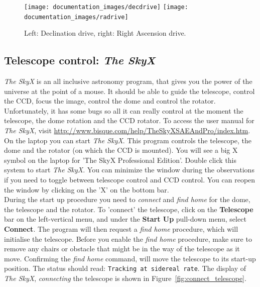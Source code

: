 \documentclass[12pt,twoside,a4paper]{report}
\begin{document}
\begin{figure}[ht]
 \centering
    \texttt{[image: documentation\_images/decdrive]}
    \texttt{[image: documentation\_images/radrive]}
    \caption{\label{fig:drives} Left: Declination drive, right: Right Ascension drive.}
\end{figure}

\subsection{Telescope control: \emph{The SkyX}}

\emph{The SkyX} is an all inclusive astronomy program, that gives you the power of the 
universe at the point of a mouse. It should be able to guide the telescope, control the CCD, 
focus the image, control the dome and control the rotator. 
Unfortunately, it has some bugs so all it can really control at the moment the telescope, the 
dome rotation and the CCD rotator. To access the user manual for \emph{The SkyX}, 
visit \url{http://www.bisque.com/help/TheSkyXSAEAndPro/index.htm}.\\

On the laptop you can start \emph{The SkyX}. This program controls the telescope, the dome and the
rotator (on which the CCD is mounted).
You will see a big X symbol on the laptop for 'The SkyX Professional Edition'. Double click this
system to start \emph{The SkyX}. You can minimize the window during the observations if you need to 
toggle between telescope control and CCD control. You can reopen the window by clicking on the 'X' 
on the bottom bar.\\

During the start up procedure you need to \textit{connect} and \textit{find home} for the dome, 
the telescope and the rotator. 
To 'connect' the telescope, click on the \textbf{Telescope} bar on the left-vertical menu, and 
under the \textbf{Start Up} pull-down menu, select \textbf{Connect}. The program will then request 
a \textit{find home} procedure, which will initialise the telescope. Before you enable the 
\textit{find home} procedure, make sure to remove any chairs or obstacle that might be in the
way of the telescope as it move. Confirming the \textit{find home} command, will move the telescope 
to its start-up position. The status should read: {\textcolor{PineGreen}{\tt Tracking at sidereal rate}}.
The display of \emph{The SkyX},  \textit{connecting} the telescope is shown in 
Figure~\ref{fig:connect_telescope}.\\
\end{document}
